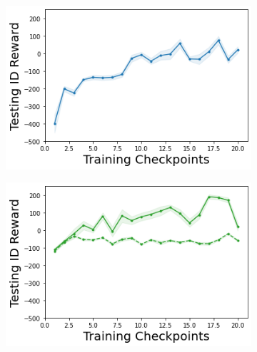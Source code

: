 \begin{figure}
\begin{subfigure}{.2\textwidth}
    \end{subfigure}
    \begin{subfigure}{.2\textwidth}
        \includegraphics[width=\textwidth]{sections/011_icml2022/resources/DKL-LunarLander-v2-mean_reward_-testing-strategy.png}
    \end{subfigure}
    \begin{subfigure}{.2\textwidth}
        \includegraphics[width=\textwidth]{sections/011_icml2022/resources/PostNet-LunarLander-v2-mean_reward_-testing-strategy.png}
    \end{subfigure}
    

\end{figure}
